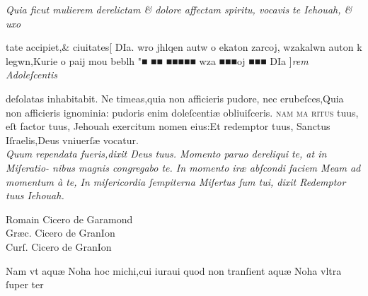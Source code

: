 \documentclass{article}
\newcommand{\threecolumntypefacenames}[3]{\begin{multicols}{3}
		\tiny
		\hfill \qquad \qquad \qquad \qquad #1\hspace*{\fill}\\
		\columnbreak
		\hfill #2\hspace*{\fill}\\
		\columnbreak
		\hfill #3\qquad \qquad \qquad \qquad \hspace*{\fill}
\end{multicols}}
\newcommand{\greektext}{\grecs wro jhlqen autw o ekaton zarcoj, wzakalwn auton k legwn,Kurie o paij mou beblh "\normalfont}
\begin{document}
{\begin{multicols}{2}
	\columnbreak
	\fontsize{8}{9}\selectfont
	\justifying
	\noindent
	\textit{Quia ficut mulierem derelictam \& dolore affectam spiritu, vocavis te Iehouah, \& uxo}
\end{multicols}
\fontsize{8}{9}\selectfont
\vspace{-2.3\baselineskip}
\noindent tate accipiet,\& ciuitates\hfill\hfill {\normalsize [ {\large \scalebox{0.8}{☞}}}\hfill \grecs DIa. \greektext ■ ■■ ■■■■■ \grecs wza ■■■oj ■■■ DIa \normalfont \hfill{\normalsize {\large \scalebox{0.8}{☜}} ]}\hfill \textit{rem Adoleſcentis\linebreak}
\vspace{-2.3\baselineskip}
\begin{multicols}{2}
	\fontsize{8}{9}\selectfont
	\justifying
	\noindent deſolatas inhabitabit. Ne timeas,quia non afficieris pudore, nec erubeſces,Quia\linebreak
	non afficieris ignominia: pudoris enim doleſcenti\ae{} obliuiſceris. \textsc{nam ma\linebreak
		ritus} tuus, eſt factor tuus, Jehouah exercitum nomen eius:Et redemptor tuus,\linebreak
	Sanctus Iſraelis,Deus vniuerſ\ae{} vocatur. \\

	\columnbreak
	\fontsize{8}{9}\selectfont
	\justifying
	\noindent
	\textit{Quum rependata fueris,dixit Deus tuus. Momento paruo dereliqui te, at in Miſeratio-\linebreak
		nibus magnis congregabo te. In momento ir\ae{} abſcondi faciem {M}eam ad momentum \`a te,\linebreak
		In miſericordia ſempiterna Miſertus ſum tui, dixit Redemptor tuus Iehouah.}
\end{multicols}
\vspace{-3.5\baselineskip}
\threecolumntypefacenames{Romain Cicero de Garamond}{Gr\ae{}c. Cicero de GranIon}{Curſ. Cicero de GranIon}
\vspace{-2.5\baselineskip}
\begin{multicols}{2}
	\fontsize{7}{8}\selectfont
	\justifying
	\noindent \quad Nam vt aqu\ae{} Noha hoc michi,cui iuraui quod non tranſient aqu\ae{} Noha vltra ſuper ter\linebreak


\end{multicols}}
\end{document}
